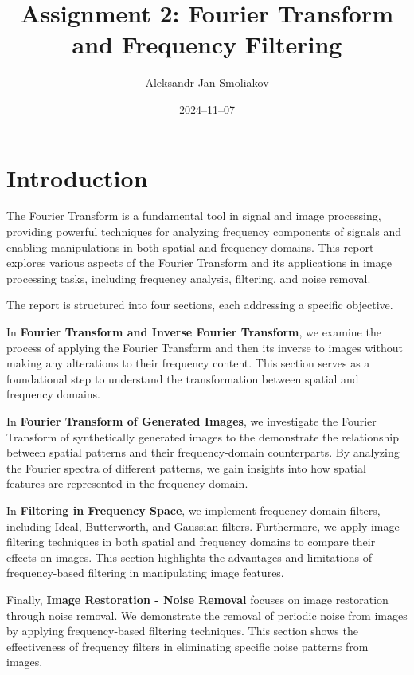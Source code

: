 \documentclass[a4paper,12pt]{article}
\title{Assignment 2: Fourier Transform and Frequency Filtering}
\author{Aleksandr Jan Smoliakov}
\date{2024--11--07}
\begin{document}
\maketitle

\section{Introduction}

The Fourier Transform is a fundamental tool in signal and image processing, providing powerful techniques for analyzing frequency components of signals and enabling manipulations in both spatial and frequency domains. This report explores various aspects of the Fourier Transform and its applications in image processing tasks, including frequency analysis, filtering, and noise removal.

The report is structured into four sections, each addressing a specific objective.

In \textbf{Fourier Transform and Inverse Fourier Transform}, we examine the process of applying the Fourier Transform and then its inverse to images without making any alterations to their frequency content. This section serves as a foundational step to understand the transformation between spatial and frequency domains.

In \textbf{Fourier Transform of Generated Images}, we investigate the Fourier Transform of synthetically generated images to the demonstrate the relationship between spatial patterns and their frequency-domain counterparts. By analyzing the Fourier spectra of different patterns, we gain insights into how spatial features are represented in the frequency domain.

In \textbf{Filtering in Frequency Space}, we implement frequency-domain filters, including Ideal, Butterworth, and Gaussian filters. Furthermore, we apply image filtering techniques in both spatial and frequency domains to compare their effects on images. This section highlights the advantages and limitations of frequency-based filtering in manipulating image features.

Finally, \textbf{Image Restoration - Noise Removal} focuses on image restoration through noise removal. We demonstrate the removal of periodic noise from images by applying frequency-based filtering techniques. This section shows the effectiveness of frequency filters in eliminating specific noise patterns from images.

\newpage

\tableofcontents
\end{document}
